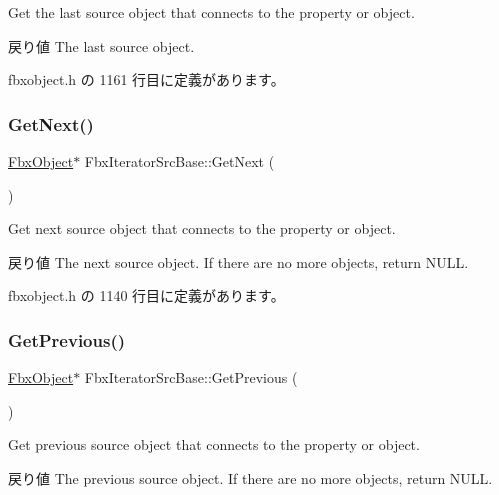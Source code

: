 Get the last source object that connects to the property or object. \begin{DoxyReturn}{戻り値}
The last source object. 
\end{DoxyReturn}


 fbxobject.\+h の 1161 行目に定義があります。

\mbox{\label{class_fbx_iterator_src_base_a640019fa81262dd57ac07bba9efc47e6}} 
\subsubsection{\texorpdfstring{Get\+Next()}{GetNext()}}
{\footnotesize\ttfamily \hyperlink{class_fbx_object}{Fbx\+Object}$\ast$ Fbx\+Iterator\+Src\+Base\+::\+Get\+Next (\begin{DoxyParamCaption}{ }\end{DoxyParamCaption})\hspace{0.3cm}{\ttfamily [inline]}}

Get next source object that connects to the property or object. \begin{DoxyReturn}{戻り値}
The next source object. If there are no more objects, return N\+U\+LL. 
\end{DoxyReturn}


 fbxobject.\+h の 1140 行目に定義があります。

\mbox{\label{class_fbx_iterator_src_base_a953061817a99a4440f964ae584dcb0b5}} 
\subsubsection{\texorpdfstring{Get\+Previous()}{GetPrevious()}}
{\footnotesize\ttfamily \hyperlink{class_fbx_object}{Fbx\+Object}$\ast$ Fbx\+Iterator\+Src\+Base\+::\+Get\+Previous (\begin{DoxyParamCaption}{ }\end{DoxyParamCaption})\hspace{0.3cm}{\ttfamily [inline]}}

Get previous source object that connects to the property or object. \begin{DoxyReturn}{戻り値}
The previous source object. If there are no more objects, return N\+U\+LL. 
\end{DoxyReturn}


